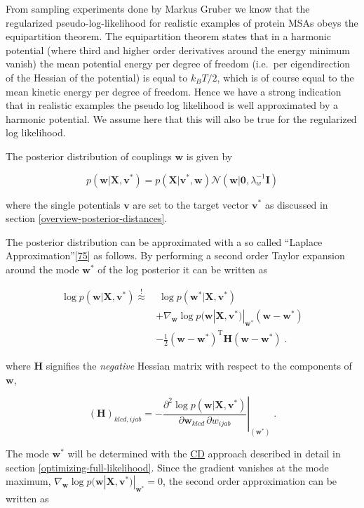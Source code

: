 \documentclass[12pt,a4paper,twoside]{book}
\newcommand{\Gauss}{\mathcal{N}}
\renewcommand{\H}{\mathbf{H}}
\newcommand{\I}{\mathbf{I}}
\renewcommand{\v}{\mathbf{v}}
\newcommand{\w}{\mathbf{w}}
\newcommand{\wijab}{w_{ijab}}
\newcommand{\X}{\mathbf{X}}
\theoremstyle{definition}
\theoremstyle{definition}
\theoremstyle{remark}
\begin{document}
From sampling experiments done by Markus Gruber we know that the
regularized pseudo-log-likelihood for realistic examples of protein MSAs
obeys the equipartition theorem. The equipartition theorem states that
in a harmonic potential (where third and higher order derivatives around
the energy minimum vanish) the mean potential energy per degree of
freedom (i.e.~per eigendirection of the Hessian of the potential) is
equal to \(k_B T/2\), which is of course equal to the mean kinetic
energy per degree of freedom. Hence we have a strong indication that in
realistic examples the pseudo log likelihood is well approximated by a
harmonic potential. We assume here that this will also be true for the
regularized log likelihood.

The posterior distribution of couplings \(\w\) is given by

\begin{equation}
p(\w | \X , \v^*) = p(\X | \v^*, \w) \Gauss (\w | \mathbf{0}, \lambda_w^{-1} \I)
\end{equation}

where the single potentials \(\v\) are set to the target vector \(\v^*\)
as discussed in section \ref{overview-posterior-distances}.

The posterior distribution can be approximated with a so called
``Laplace Approximation''{[}\protect\hyperlink{ref-Murphy2012}{75}{]} as
follows. By performing a second order Taylor expansion around the mode
\(\w^*\) of the log posterior it can be written as

\begin{align}
    \log p(\w | \X , \v^*) \overset{!}{\approx} &  \;  \log p(\w^* | \X , \v^*) \\
                & + \nabla_\w \log p(\w | \X , \v^*)|_{\w^*}(\w-\w^*) \\ 
                & - \frac{1}{2} (\w-\w^*)^{\mathrm{T}} \H (\w-\w^*)  \; .
\end{align}

where \(\H\) signifies the \emph{negative} Hessian matrix with respect
to the components of \(\w\),

\begin{equation}
    (\H)_{klcd, ijab} = - \left. \frac{\partial^2  \log p(\w | \X , \v^{*})}{\partial \w_{klcd} \, \partial \wijab  } \right|_{(\w^{*})} \; .
\end{equation}

The mode \(\w^*\) will be determined with the
\protect\hyperlink{abbrev}{CD} approach described in detail in section
\ref{optimizing-full-likelihood}. Since the gradient vanishes at the
mode maximum, \(\nabla_\w \log p(\w | \X , \v^*)|_{\w^*} = 0\), the
second order approximation can be written as
\end{document}
